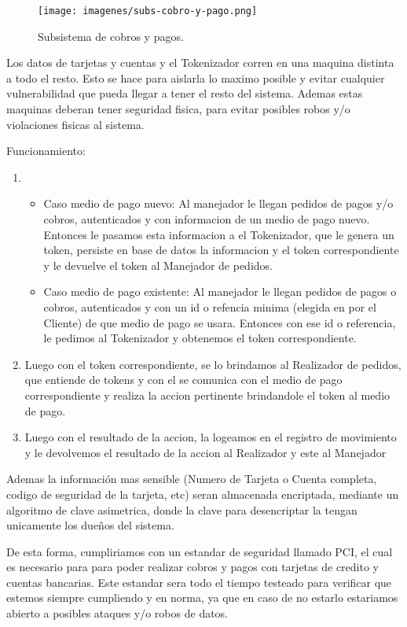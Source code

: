 \begin{figure}[H]
  \centering
  \texttt{[image: imagenes/subs-cobro-y-pago.png]}
  \caption{Subsistema de cobros y pagos.}
\end{figure}

Los datos de tarjetas y cuentas y el Tokenizador corren en una maquina distinta a todo el resto. Esto se hace para aislarla lo maximo posible y evitar cualquier vulnerabilidad que pueda llegar a tener el resto del sistema. Ademas estas maquinas deberan tener seguridad fisica, para evitar posibles robos y/o violaciones fisicas al sistema.

Funcionamiento:
\begin{enumerate}
\item {
  \begin{itemize}
  \item Caso medio de pago nuevo:
  Al manejador le llegan pedidos de pagos y/o cobros, autenticados y con informacion de un medio de pago nuevo. Entonces le pasamos esta informacion a el Tokenizador, que le genera un token, persiste en base de datos la informacion y el token correspondiente y le devuelve el token al Manejador de pedidos.
  \item Caso medio de pago existente:
  Al manejador le llegan pedidos de pagos o cobros, autenticados y con un id o refencia minima (elegida en por el Cliente) de que medio de pago se usara. Entonces con ese id o referencia, le pedimos al Tokenizador y obtenemos el token correspondiente.
  \end{itemize}
}

\item Luego con el token correspondiente, se lo brindamos al Realizador de pedidos, que entiende de tokens y con el se comunica con el medio de pago correspondiente y realiza la accion pertinente brindandole el token al medio de pago.

\item Luego con el resultado de la accion, la logeamos en el registro de movimiento y le devolvemos el resultado de la accion al Realizador y este al Manejador
\end{enumerate}

Ademas la información mas sensible (Numero de Tarjeta o Cuenta completa, codigo de seguridad de la tarjeta, etc) seran almacenada encriptada, mediante un algoritmo de clave asimetrica, donde la clave para desencriptar la tengan unicamente los dueños del sistema.

De esta forma, cumpliriamos con un estandar de seguridad llamado PCI, el cual es necesario para para poder realizar cobros y pagos con tarjetas de credito y cuentas bancarias. Este estandar sera todo el tiempo testeado para verificar que estemos siempre cumpliendo y en norma, ya que en caso de no estarlo estariamos abierto a posibles ataques y/o robos de datos.

